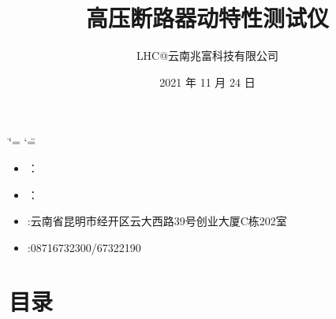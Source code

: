 \documentclass[a4paper,10pt,english]{sphinxmanual}
\title{高压断路器动特性测试仪}
\date{2021 年 11 月 24 日}
\author{LHC@云南兆富科技有限公司}
\begin{document}
\ifdefined\shorthandoff
  \ifnum\catcode`\=\string=\active\shorthandoff{=}\fi
  \ifnum\catcode`\"=\active{}\fi
\fi

\pagestyle{empty}
\sphinxmaketitle
\pagestyle{plain}
\sphinxtableofcontents
\pagestyle{normal}
\label{\detokenize{index::doc}}


\begin{figure}[htbp]
\centering

\noindent{}
\end{figure}
\begin{itemize}
\item {} 
\sphinxAtStartPar
{}：

\item {} 
\sphinxAtStartPar
{}：

\item {} 
\sphinxAtStartPar
{}:云南省昆明市经开区云大西路39号创业大厦C栋202室

\item {} 
\sphinxAtStartPar
{}:0871\sphinxhyphen{}6732300/67322190

\end{itemize}


\chapter{目录}
\label{\detokenize{index:id2}}
\end{document}
